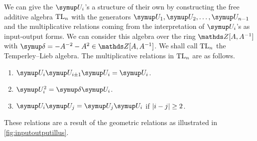 We can give the \(\U_i\)'s a structure of their own by constructing the free additive algebra \(\text{TL}_n\) with the generators \(\U_1, \U_2,\ldots, \U_{n-1}\) and the multiplicative relations coming from the interpretation of \(\U_i\)'s as input-output forms. We can consider this algebra over the ring \(\Z[A, A^{-1}]\) with \(\updelta = -A^{-2} - A^2 \in \Z[A, A^{-1}]\). We shall call \(\text{TL}_n\) the Temperley--Lieb algebra. The multiplicative relations in \(\text{TL}_n\) are as follows.
\begin{enumerate}
	\item \(\U_i\U_{i\pm 1}\U_i = \U_i\).
	\item \(\U_i^2 = \updelta \U_i\).
	\item \(\U_i\U_j = \U_j\U_i\) if \(\lvert i-j\rvert \geq 2\).
\end{enumerate}
These relations are a result of the geometric relations as illustrated in \cref{fig:inputoutputillus}.
